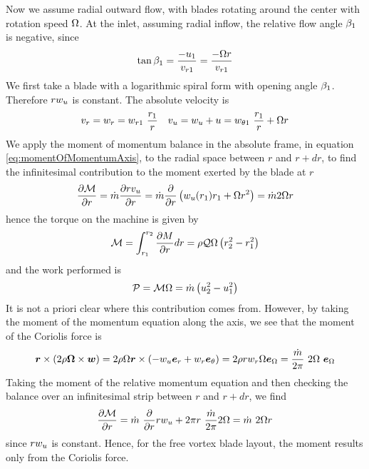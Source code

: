 Now we assume radial outward flow, with blades rotating around the
center with rotation speed $\Omega$. At the inlet, assuming radial
inflow, the relative flow angle $\beta_1$ is negative, since
\begin{align*}
\tan \beta_1 = \frac{- u_1}{v_{r1}} = \frac{-\Omega r}{v_{r1}}
\end{align*}
We first take a blade with a logarithmic spiral form with opening
angle $\beta_1$. Therefore $r w_{u}$ is constant. The
absolute velocity is
\begin{align*}
  v_r  &= w_r  = w_{r1}~\frac{r_1}{r} & 
  v_{u} &= w_{u} + u = w_{\theta 1}~\frac{r_1}{r} + \Omega r \\
\end{align*}
We apply the moment of momentum balance in the absolute frame, in
equation \ref{eq:momentOfMomentumAxis}, to the radial space between
$r$ and $r+dr$, to find the infinitesimal contribution to the moment
exerted by the blade at $r$
\begin{align*}
  \frac{\partial \mathcal M}{\partial r} = 
  \dot m \frac{\partial r v_{u}}{\partial r} = 
  \dot m \frac{\partial }{\partial r} \left(w_{u}(r_1) r_1 + \Omega r^2 \right) = 
  \dot m 2 \Omega r 
\end{align*}
hence the torque on the machine is given by
\begin{align*}
  \mathcal M = \int_{r_1}^{r_2} \frac{\partial M}{\partial r} dr = \rho \mathcal Q \Omega
  \left(r_2^2 - r_1^2\right)
\end{align*}
and the work performed is 
\begin{align*}
  \mathcal P = \mathcal M \Omega = \dot m \left(u_2^2 - u_1^2\right)
\end{align*}
It is not a priori clear where this contribution comes from. However,
by taking the moment of the momentum equation along the axis, we see
that the moment of the Coriolis force is
\begin{align*}
  \boldsymbol {r} \times \left(2 \rho \boldsymbol {\Omega} \times \boldsymbol {w}\right) = 
  2 \rho \Omega \boldsymbol {r} \times \left( - w_{u} \boldsymbol e_{r} + w_r \boldsymbol e_{\theta}\right) =
  2  \rho r w_r \Omega \boldsymbol e_{\Omega} = \frac{\dot m}{2 \pi} ~2 \Omega ~\boldsymbol e_{\Omega}
\end{align*}
Taking the moment of the relative momentum equation and then checking
the balance over an infinitesimal strip between $r$ and $r+dr$, we find
\begin{align*}
  \frac{\partial \mathcal M}{\partial r} = \dot m~\frac{\partial }{\partial r} r w_{u} + 2 \pi r ~\frac{\dot m}{2 \pi} 2 \Omega = \dot m ~2 \Omega r 
\end{align*}
since $r w_{u}$ is constant. Hence, for the free vortex blade
layout, the moment results only from the Coriolis force.


